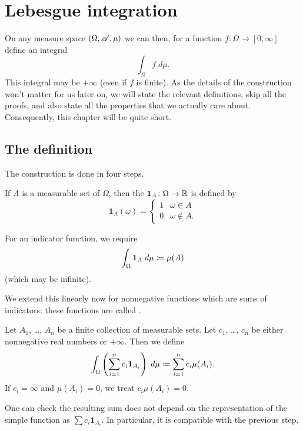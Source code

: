 \chapter{Lebesgue integration}
\label{ch:lebesgue_integration}
On any measure space $(\Omega, \mathscr A, \mu)$ we can then,
for a function $f \colon \Omega \to [0,\infty]$
define an integral
\[ \int_\Omega f \; d\mu. \]
This integral may be $+\infty$ (even if $f$ is finite).
As the details of the construction won't matter for us later on,
we will state the relevant definitions,
skip all the proofs,
and also state all the properties that we actually care about.
Consequently, this chapter will be quite short.

\section{The definition}
The construction is done in four steps.
\begin{definition}
	If $A$ is a measurable set of $\Omega$,
	then the 
	$\mathbf{1}_A \colon \Omega \to \mathbb R$ is defined by
	\[ \mathbf{1}_A(\omega) = \begin{cases}
			1 & \omega \in A \\
			0 & \omega \notin A.
		\end{cases} \]
\end{definition}

\begin{step}
	For an indicator function, we require
	\[ \int_\Omega \mathbf{1}_A \; d\mu \coloneqq \mu(A) \]
	(which may be infinite).
\end{step}
We extend this linearly now for nonnegative functions
which are sums of indicators:
these functions are called .
\begin{step}
	Let $A_1$, \dots, $A_n$ be a finite collection of measurable sets.
	Let $c_1$, \dots, $c_n$ be either nonnegative real numbers or $+\infty$.
	Then we define
	\[ \int_\Omega \left( \sum_{i=1}^n c_i \mathbf{1}_{A_i} \right) \; d\mu
		\coloneqq \sum_{i=1}^n c_i \mu(A_i). \]
	If $c_i = \infty$ and $\mu(A_i) = 0$, we treat $c_i \mu(A_i) = 0$.
\end{step}
One can check the resulting sum does not depend
on the representation of the simple function as $\sum c_i \mathbf{1}_{A_i}$.
In particular, it is compatible with the previous step.

